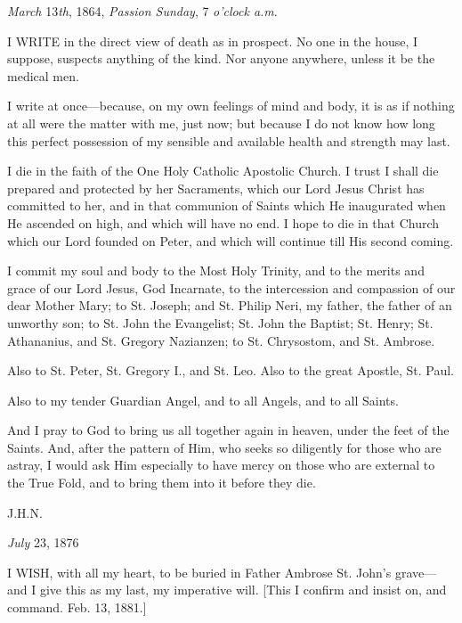 

\emph{March} 13\emph{th}, 1864, \emph{Passion Sunday}, 7 \emph{o'clock a.m}.

I WRITE in the direct
view of death as in prospect. No one in the house, I suppose, suspects
anything of the kind. Nor anyone anywhere, unless it be the medical men.

I write at once—because, on my
own feelings of mind and body, it is as if nothing at all were the
matter with me, just now; but because I do not know how long this
perfect possession of my sensible and available health and strength may
last.

I die in the faith of the One
Holy Catholic Apostolic Church. I trust I shall die prepared and
protected by her Sacraments, which our Lord Jesus Christ has committed
to her, and in that communion of Saints which He inaugurated when He
ascended on high, and which will have no end. I hope to die in that
Church which our Lord founded on Peter, and which will continue till His
second coming.

I commit my soul and body to the
Most Holy Trinity, and to the merits and grace of our Lord Jesus, God
Incarnate, to the intercession and compassion of our dear Mother Mary;
to St. Joseph; and St. Philip Neri, my father, the father of an
unworthy son; to St. John the Evangelist; St. John the Baptist; St.
Henry; St. Athananius, and St. Gregory Nazianzen; to St. Chrysostom, and
St. Ambrose.

Also to St. Peter, St. Gregory
I., and St. Leo. Also to the great Apostle, St. Paul.

Also to my tender Guardian
Angel, and to all Angels, and to all Saints.

And I pray to God to bring us
all together again in heaven, under the feet of the Saints. And, after
the pattern of Him, who seeks so diligently for those who are astray, I
would ask Him especially to have mercy on those who are external to the
True Fold, and to bring them into it before they die.

J.H.N.


\emph{July}
23, 1876

I WISH, with all my
heart, to be buried in Father Ambrose St. John's grave—and I give this
as my last, my imperative will. [This I confirm and insist on, and
command. Feb. 13, 1881.]

